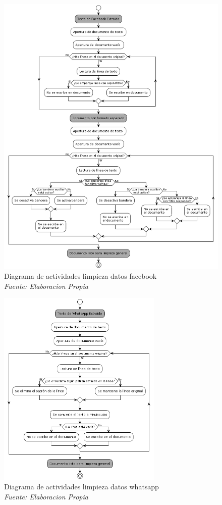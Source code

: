 \begin{figure}[h!]
	\includegraphics[width=1\textwidth]{capitulo5/figuras/prueba.png}
	\caption{Diagrama de actividades limpieza datos facebook
		\\\textit{Fuente: Elaboracion Propia}}
	\label{fig:um12}
\end{figure}

\begin{figure}[h!]
	\includegraphics[width=0.7\textwidth]{capitulo5/figuras/part3.png}
	\caption{Diagrama de actividades limpieza datos whatsapp
		\\\textit{Fuente: Elaboracion Propia}}
	\label{fig:um13}
\end{figure}



